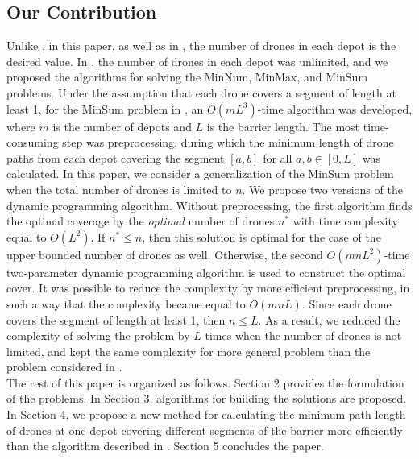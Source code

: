 \documentclass[runningheads]{llncs}
\begin{document}
\subsection{Our Contribution}
Unlike \cite{ErPlot20}, in this paper, as well as in \cite{ErShad24}, the number of drones in each depot is the desired value. In \cite{ErShad24}, the number of drones in each depot was unlimited, and we proposed the algorithms for solving the MinNum, MinMax, and MinSum problems. Under the assumption that each drone covers a segment of length at least 1, for the MinSum problem in \cite{ErShad24}, an $O(mL^3)$-time algorithm was developed, where $m$ is the number of depots and $L$ is the barrier length. The most time-consuming step was preprocessing, during which the minimum length of drone paths from each depot covering the segment $[a,b]$ for all $a,b\in [0,L]$ was calculated. In this paper, we consider a generalization of the MinSum problem when the total number of drones is limited to $n$. We propose two versions of the dynamic programming algorithm. Without preprocessing, the first algorithm finds the optimal coverage by the \emph{optimal} number of drones $n^*$ with time complexity equal to $O(L^2)$. If $n^*\leq n$, then this solution is optimal for the case of the upper bounded number of drones as well. Otherwise, the second $O(mnL^2)$-time two-parameter dynamic programming algorithm is used to construct the optimal cover. It was possible to reduce the complexity by more efficient preprocessing, in such a way that the complexity became equal to $O(mnL)$. Since each drone covers the segment of length at least 1, then $n\leq L$. As a result, we reduced the complexity of solving the problem by $L$ times when the number of drones is not limited, and kept the same complexity for more general problem than the problem considered in \cite{ErShad24}.\\

The rest of this paper is organized as follows. Section 2 provides the formulation of the problems. In Section 3, algorithms for building the solutions are proposed. In Section 4, we propose a new method for calculating the minimum path length of drones at one depot covering different segments of the barrier more efficiently than the algorithm described in \cite{ErShad24}. Section 5 concludes the paper.
\end{document}
